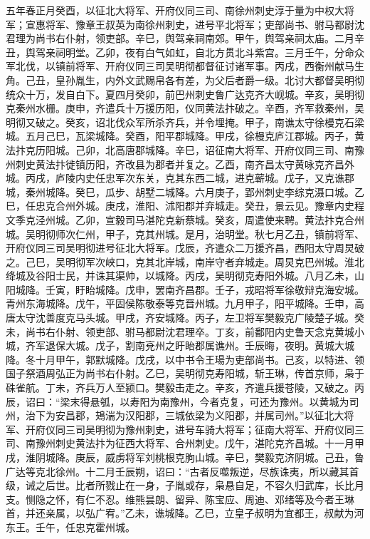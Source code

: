\documentclass[]{article}
\begin{document}
五年春正月癸酉，以征北大将军、开府仪同三司、南徐州刺史淳于量为中权大将军；宣惠将军、豫章王叔英为南徐州刺史，进号平北将军；吏部尚书、驸马都尉沈君理为尚书右仆射，领吏部。辛巳，舆驾亲祠南郊。甲午，舆驾亲祠太庙。二月辛丑，舆驾亲祠明堂。乙卯，夜有白气如虹，自北方贯北斗紫宫。三月壬午，分命众军北伐，以镇前将军、开府仪同三司吴明彻都督征讨诸军事。丙戌，西衡州献马生角。己丑，皇孙胤生，内外文武赐帛各有差，为父后者爵一级。北讨大都督吴明彻统众十万，发自白下。夏四月癸卯，前巴州刺史鲁广达克齐大岘城。辛亥，吴明彻克秦州水栅。庚申，齐遣兵十万援历阳，仪同黄法抃破之。辛酉，齐军救秦州，吴明彻又破之。癸亥，诏北伐众军所杀齐兵，并令埋掩。甲子，南谯太守徐槾克石梁城。五月己巳，瓦梁城降。癸酉，阳平郡城降。甲戌，徐槾克庐江郡城。丙子，黄法抃克历阳城。己卯，北高唐郡城降。辛巳，诏征南大将军、开府仪同三司、南豫州刺史黄法抃徙镇历阳，齐改县为郡者并复之。乙酉，南齐昌太守黄咏克齐昌外城。丙戌，庐陵内史任忠军次东关，克其东西二城，进克蕲城。戊子，又克谯郡城，秦州城降。癸巳，瓜步、胡墅二城降。六月庚子，郢州刺史李综克滠口城。乙巳，任忠克合州外城。庚戌，淮阳、沭阳郡并弃城走。癸丑，景云见。豫章内史程文季克泾州城。乙卯，宣毅司马湛陀克新蔡城。癸亥，周遣使来聘。黄法抃克合州城。吴明彻师次仁州，甲子，克其州城。是月，治明堂。秋七月乙丑，镇前将军、开府仪同三司吴明彻进号征北大将军。戊辰，齐遣众二万援齐昌，西阳太守周炅破之。己巳，吴明彻军次峡口，克其北岸城，南岸守者弃城走。周炅克巴州城。淮北绛城及谷阳士民，并诛其渠帅，以城降。丙戌，吴明彻克寿阳外城。八月乙未，山阳城降。壬寅，盱眙城降。戊申，罢南齐昌郡。壬子，戎昭将军徐敬辩克海安城。青州东海城降。戊午，平固侯陈敬泰等克晋州城。九月甲子，阳平城降。壬申，高唐太守沈善度克马头城。甲戌，齐安城降。丙子，左卫将军樊毅克广陵楚子城。癸未，尚书右仆射、领吏部、驸马都尉沈君理卒。丁亥，前鄱阳内史鲁天念克黄城小城，齐军退保大城。戊子，割南兗州之盱眙郡属谯州。壬辰晦，夜明。黄城大城降。冬十月甲午，郭默城降。戊戌，以中书令王瑒为吏部尚书。己亥，以特进、领国子祭酒周弘正为尚书右仆射。乙巳，吴明彻克寿阳城，斩王琳，传首京师，枭于硃雀航。丁未，齐兵万人至颍口。樊毅击走之。辛亥，齐遣兵援苍陵，又破之。丙辰，诏曰：``梁末得悬瓠，以寿阳为南豫州，今者克复，可还为豫州。以黄城为司州，治下为安昌郡，鳷湍为汉阳郡，三城依梁为义阳郡，并属司州。''以征北大将军、开府仪同三司吴明彻为豫州刺史，进号车骑大将军；征南大将军、开府仪同三司、南豫州刺史黄法抃为征西大将军、合州刺史。戊午，湛陀克齐昌城。十一月甲戌，淮阴城降。庚辰，威虏将军刘桃根克朐山城。辛巳，樊毅克济阴城。己丑，鲁广达等克北徐州。十二月壬辰朔，诏曰：``古者反噬叛逆，尽族诛夷，所以藏其首级，诫之后世。比者所戮止在一身，子胤或存，枭悬自足，不容久归武库，长比月支。恻隐之怀，有仁不忍。维熊昙朗、留异、陈宝应、周迪、邓绪等及今者王琳首，并还亲属，以弘广宥。''乙未，谯城降。乙巳，立皇子叔明为宜都王，叔献为河东王。壬午，任忠克霍州城。
\end{document}
